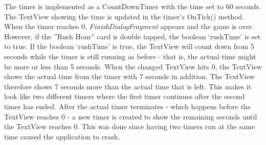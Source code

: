 \newpage
The timer is implemented as a CountDownTimer with the time set to 60 seconds. The TextView showing the time is updated in the timer’s OnTick() method.  When the timer reaches 0, \emph{FinishDialogFragment} appears and the game is over. However, if the ''Rush Hour'' card is double tapped, the boolean `rushTime' is set to true. If the boolean `rushTime' is true, the TextView will count down from 5 seconds while the timer is still running as before - that is, the actual time might be more or less than 5 seconds. When the changed TextView hits 0, the TextView shows the actual time from the timer with 7 seconds in addition. The TextView therefore shows 7 seconds more than the actual time that is left. This makes it look like two different timers where the first timer continues after the second timer has ended. After the actual timer terminates - which happens before the TextView reaches 0 - a new timer is created to show the remaining seconds until the TextView reaches 0. This was done since having two timers run at the same time caused the application to crash.



